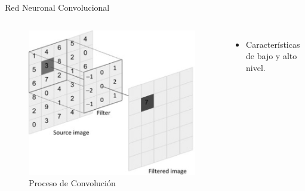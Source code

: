 \documentclass[12pt,aspectratio=169]{beamer}
\begin{document}
\begin{frame}{Red Neuronal Convolucional}
    \begin{columns}[c] 
        
            \begin{figure}[h]
                \includegraphics[scale=0.4]{figs/conv_2d.jpg}
                \caption{Proceso de Convolución}
            \end{figure}
            
        
            \begin{itemize}
                \item Características de bajo y alto nivel.
                \vspace{4mm}
                

\end{itemize}
\end{columns}
\end{frame}
\end{document}
